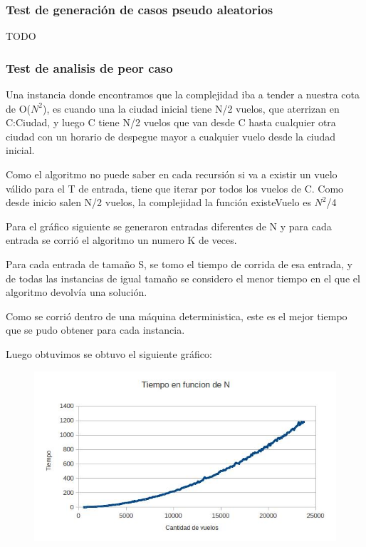 \subsubsection{Test de generaci\'on de casos pseudo aleatorios}

TODO
\newpage
\subsubsection{Test de analisis de peor caso}

Una instancia donde encontramos que la complejidad iba a tender a nuestra cota de O($N^{2}$), es cuando una la ciudad inicial tiene N/2 vuelos, que aterrizan en C:Ciudad, y luego C tiene N/2 vuelos que van desde C hasta cualquier otra ciudad con un horario de despegue mayor a cualquier vuelo desde la ciudad inicial.

Como el algoritmo no puede saber en cada recursi\'on si va a existir un vuelo v\'alido para el T de entrada, tiene que iterar por todos los vuelos de C. Como desde inicio salen N/2 vuelos, la complejidad la funci\'on existeVuelo es $N^{2}$/4

Para el gr\'afico siguiente se generaron entradas diferentes de N y para cada entrada se corri\'o el algoritmo un numero K de veces.

Para cada entrada de tamaño S, se tomo el tiempo de corrida de esa entrada, y de todas las instancias de igual tamaño se considero el menor tiempo en el que el algoritmo devolv\'ia una soluci\'on.

Como se corri\'o dentro de una m\'aquina deterministica, este es el mejor tiempo que se pudo obtener para cada instancia. 

Luego obtuvimos se obtuvo el siguiente gr\'afico:

\begin{figure}[ht]
	\begin{minipage}[t]{\linewidth}
		\centering
		\includegraphics[width=\textwidth]{GraficoDeVuelosYTiempo.jpg}
	\end{minipage}	
\end{figure}

